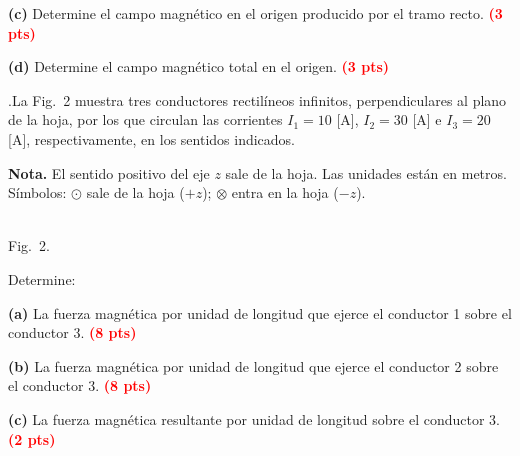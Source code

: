 \documentclass[addpoints,12pt]{exam}
\newcommand{\qpts}[1]{{\setlength{\fboxsep}{2.5pt}\fbox{#1}}\hspace{0.6em}\ignorespaces}
\newcommand{\qhead}[1]{\thequestion.\hspace{0.5em}\qpts{#1}}
\newcommand{\pts}[1]{\textcolor{red}{\textbf{(#1 pts)}}}
\newcommand{\isale}[1]{%
  \draw[ubbblue,line width=1.4pt,fill=white] (#1) circle (0.2);
  \fill[ubbblue] (#1) circle (0.075);}
\newcommand{\ientra}[1]{%
  \draw[ubbblue,line width=1.4pt,fill=white] (#1) circle (0.2);
  \draw[ubbblue,line width=1.4pt] ($(#1)+(-0.13,-0.13)$)--($(#1)+(0.13,0.13)$)
        ($(#1)+(-0.13,0.13)$)--($(#1)+(0.13,-0.13)$);}
\begin{document}
\begin{questions}
\vspace{7.5cm}
\noindent\textbf{(c)} Determine el campo magn\'etico en el origen producido por el tramo recto.
\pts{3}

\vspace{3.5cm}
\noindent\textbf{(d)} Determine el campo magn\'etico total en el origen. \pts{3}

\newpage

\question[20]
\begin{minipage}[t]{0.56\textwidth}
\vspace{0pt}
\qhead{20}La Fig.~2 muestra
tres conductores rectil\'ineos infinitos, perpendiculares al plano de la hoja, por los que circulan
las corrientes $I_1 = 10$ [A], $I_2 = 30$ [A] e $I_3 = 20$ [A], respectivamente, en los sentidos indicados.

\smallskip
\noindent\textbf{Nota.} El sentido positivo del eje $z$ sale de la hoja. Las unidades est\'an en
metros. S\'imbolos: $\odot$ sale de la hoja ($+z$); $\otimes$ entra en la hoja ($-z$).
\end{minipage}\hfill
\begin{minipage}[t]{0.40\textwidth}
\vspace{0pt}
\centering
{}
\\[2pt]
{\footnotesize Fig.\ 2.}
\end{minipage}

\medskip
\noindent Determine:

\smallskip
\noindent\textbf{(a)} La fuerza magn\'etica por unidad de longitud que ejerce el conductor 1 sobre el
conductor 3. \pts{8}

\vspace{6.5cm}
\noindent\textbf{(b)} La fuerza magn\'etica por unidad de longitud que ejerce el conductor 2 sobre el
conductor 3. \pts{8}

\vspace{6.5cm}
\noindent\textbf{(c)} La fuerza magn\'etica resultante por unidad de longitud sobre el conductor 3.
\pts{2}


\end{questions}
\end{document}

